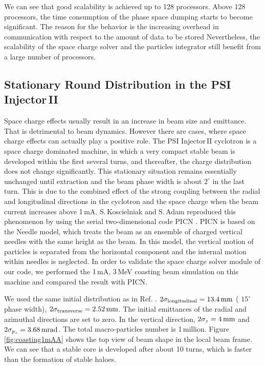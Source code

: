 \documentclass[aps,prstab,onecolumn,superscriptaddress,showpacs]{revtex4}
\begin{document}
We can see that good scalability is achieved up to 128 processors.  Above 128 processors, the time consumption of the phase space dumping starts to become significant.
The reason for the behavior is the increasing overhead in communication with respect to the amount of data to be stored 
Nevertheless, the scalability of the space charge solver and the particles integrator still benefit from a large number of processors.

\subsection{Stationary Round Distribution in the PSI Injector\,II}
Space charge effects usually result in an increase in beam size and emittance. That is detrimental to beam dynamics. 
However there are cases, where space charge effects can actually play a positive role. The PSI Injector\,II cyclotron is a space charge dominated machine, in which a very compact 
stable beam is developed within the first several turns, and thereafter, the charge distribution does not change significantly.
This stationary situation remains essentially unchanged until extraction and the beam phase width  is about $2^\circ$ in the last turn.
This is due to the combined effect of the strong coupling between the
radial and longitudinal directions in the cyclotron and the space charge when the beam current increases above 1\,mA. S.\,Koscielniak and S.\,Adam reproduced this phenomenon by 
using the serial two-dimensional code PICN \cite{Adam:2}. PICN is based on the Needle model, which treats the beam as 
an ensemble of charged vertical needles with the same height as the beam. In this model, the vertical motion of particles is separated from the horizontal 
component and the internal motion within needles is neglected. In order to validate the space charge solver module of our code, we performed the 1\,mA, 3\,MeV coasting beam simulation on this machine and compared the result with PICN.  

We used the same initial distribution as in Ref. .
$2\sigma_{\RM{longitudinal}} = 13.4 {\RM{\,mm}}$ ( $15^\circ$ phase width), $2\sigma_{\RM{transverse}} = 2.52 {\RM{\,mm}}$. 
The initial emittances of the radial and azimuthal directions are set to zero. 
In the vertical direction, $2\sigma_z = 4{\RM{\,mm}}$ and $2\sigma_{p_z} = 3.68{\RM{\,mrad}}$. 
The total macro-particles number is 1\,million.  Figure\,\ref{fig:coasting1mAA} shows the top view of beam shape in the local beam frame.
We can see that a stable core is developed after about 10 turns, which is faster than the formation of stable haloes.
\end{document}
